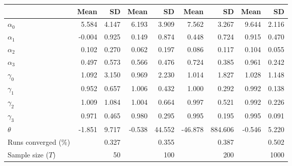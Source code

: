 
\begin{tabular}[t]{lrrrrrrrr}
\toprule
  & Mean & SD & Mean  & SD  & Mean   & SD   & Mean    & SD   \\
\midrule
$\alpha_{0}$ & 5.584 & 4.147 & 6.193 & 3.909 & 7.562 & 3.267 & 9.644 & 2.116\\
$\alpha_{1}$ & -0.004 & 0.925 & 0.149 & 0.874 & 0.448 & 0.724 & 0.915 & 0.470\\
$\alpha_{2}$ & 0.102 & 0.270 & 0.062 & 0.197 & 0.086 & 0.117 & 0.104 & 0.055\\
$\alpha_{3}$ & 0.497 & 0.573 & 0.566 & 0.476 & 0.724 & 0.385 & 0.961 & 0.242\\
$\gamma_{0}$ & 1.092 & 3.150 & 0.969 & 2.230 & 1.014 & 1.827 & 1.028 & 1.148\\
$\gamma_{1}$ & 0.952 & 0.657 & 1.006 & 0.432 & 1.000 & 0.292 & 0.992 & 0.138\\
$\gamma_{2}$ & 1.009 & 1.084 & 1.004 & 0.664 & 0.997 & 0.521 & 0.992 & 0.226\\
$\gamma_{3}$ & 0.971 & 0.465 & 0.980 & 0.295 & 0.995 & 0.195 & 0.995 & 0.091\\
$\theta$ & -1.851 & 9.717 & -0.538 & 44.552 & -46.878 & 884.606 & -0.546 & 5.220\\
Runs converged (\%) &  & 0.327 &  & 0.355 &  & 0.387 &  & 0.502\\
Sample size ($T$) &  & 50 &  & 100 &  & 200 &  & 1000\\
\bottomrule
\end{tabular}
